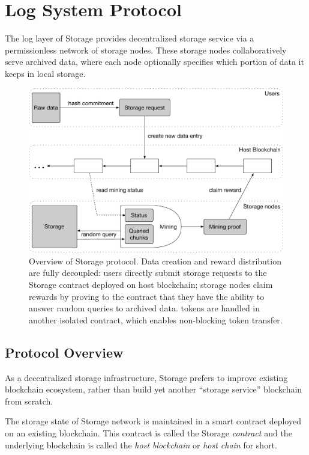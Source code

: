 \section{Log System Protocol}


The log layer of \projabbrev Storage provides decentralized storage service via a permissionless network of storage nodes.
These storage nodes collaboratively serve archived data,
where each node optionally specifies which portion of data it keeps in local storage.

\begin{figure}[H]
		\includegraphics[width=\textwidth]{figure/protocol_overview.pdf}
		\caption{Overview of \projabbrev Storage protocol. Data creation and reward distribution are fully decoupled: users directly submit storage requests to the \projabbrev Storage contract deployed on host blockchain; storage nodes claim rewards by proving to the contract that they have the ability to answer random queries to archived data. \projabbrev tokens are handled in another isolated contract, which enables non-blocking token transfer.}
		\label{fig:overview}
\end{figure}

\subsection{Protocol Overview}

As a decentralized storage infrastructure, \projabbrev Storage prefers to improve existing blockchain ecosystem, rather than build yet another ``storage service'' blockchain from scratch.

The storage state of \projabbrev Storage network is maintained in a smart contract deployed on an existing blockchain.
This contract is called the \projabbrev Storage \emph{contract} and the underlying blockchain is called the \emph{host blockchain} or \emph{host chain} for short.

